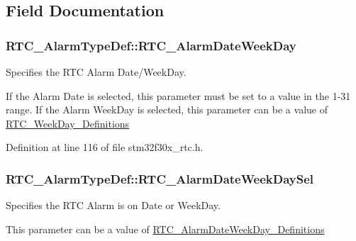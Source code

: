 \subsection{Field Documentation}
\hypertarget{struct_r_t_c___alarm_type_def_a15045e2af14cc47e70666bbfab123431}{
\subsubsection[{R\-T\-C\-\_\-\-Alarm\-Date\-Week\-Day}]{ R\-T\-C\-\_\-\-Alarm\-Type\-Def\-::\-R\-T\-C\-\_\-\-Alarm\-Date\-Week\-Day}}\label{struct_r_t_c___alarm_type_def_a15045e2af14cc47e70666bbfab123431}
\begin{DoxyVerb}           Specifies the RTC Alarm Date/WeekDay.
\end{DoxyVerb}
 If the Alarm Date is selected, this parameter must be set to a value in the 1-\/31 range. If the Alarm Week\-Day is selected, this parameter can be a value of \hyperlink{group___r_t_c___week_day___definitions}{R\-T\-C\-\_\-\-Week\-Day\-\_\-\-Definitions} 

Definition at line 116 of file stm32f30x\-\_\-rtc.\-h.

\hypertarget{struct_r_t_c___alarm_type_def_a8ccb20d2f65477dc97084c65ed455fb4}{
\subsubsection[{R\-T\-C\-\_\-\-Alarm\-Date\-Week\-Day\-Sel}]{ R\-T\-C\-\_\-\-Alarm\-Type\-Def\-::\-R\-T\-C\-\_\-\-Alarm\-Date\-Week\-Day\-Sel}}\label{struct_r_t_c___alarm_type_def_a8ccb20d2f65477dc97084c65ed455fb4}
\begin{DoxyVerb}       Specifies the RTC Alarm is on Date or WeekDay.
\end{DoxyVerb}
 This parameter can be a value of \hyperlink{group___r_t_c___alarm_date_week_day___definitions}{R\-T\-C\-\_\-\-Alarm\-Date\-Week\-Day\-\_\-\-Definitions} 

